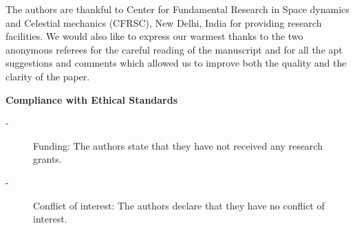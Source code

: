 \documentclass[preprint,fleqn,5p,numbers,sort&compress]{elsarticle}
\begin{document}
The authors are thankful to Center for Fundamental Research in Space dynamics and Celestial mechanics (CFRSC), New Delhi, India for providing research facilities. We would also like to express our warmest thanks to the two anonymous referees for the careful reading of the manuscript and for all the apt suggestions and comments which allowed us to improve both the quality and the clarity of the paper.\par


\textbf{Compliance with Ethical Standards}
\begin{description}
  \item[-] Funding: The authors state that they have not received any research
grants.
  \item[-] Conflict of interest: The authors declare that they have no conflict of
interest.
\end{description}
%
\end{document}
